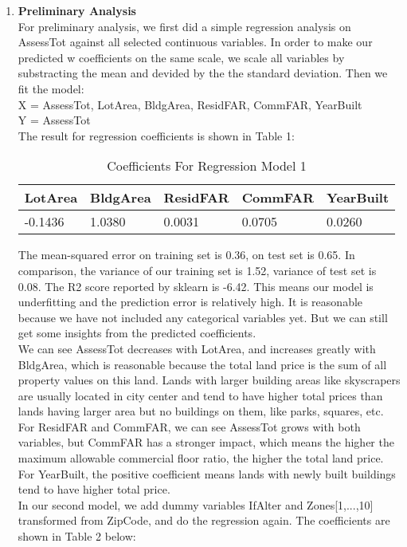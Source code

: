 \documentclass[11pt]{article}
\begin{document}
\begin{enumerate}
\item
\textbf{Preliminary Analysis}\\
For preliminary analysis, we first did a simple regression analysis on AssessTot against all selected continuous variables. In order to make our predicted w coefficients on the same scale, we scale all variables by substracting the mean and devided by the the standard deviation. Then we fit the model:\\
X = AssessTot, LotArea, BldgArea, ResidFAR, CommFAR, YearBuilt\\
Y = AssessTot\\
The result for regression coefficients is shown in Table 1:\\
\begin{table}[H]
\centering
\caption{Coefficients For Regression Model 1}
\label{my-label}
\begin{tabular}{|p{2cm}|p{2cm}|p{2cm}|p{2cm}|p{2cm}|}
\hline
LotArea & BldgArea & ResidFAR & CommFAR & YearBuilt \\
\hline
-0.1436 & 1.0380   & 0.0031   & 0.0705  & 0.0260    \\
\hline
\end{tabular}
\end{table}
The mean-squared error on training set is 0.36, on test set is 0.65. In comparison, the variance of our training set is 1.52, variance of test set is 0.08. The R2 score reported by sklearn is -6.42. This means our model is underfitting and the prediction error is relatively high. It is reasonable because we have not included any categorical variables yet. But we can still get some insights from the predicted coefficients. \\
We can see AssessTot decreases with LotArea, and increases greatly with BldgArea, which is reasonable because the total land price is the sum of all property values on this land. Lands with larger building areas like skyscrapers are usually located in city center and tend to have higher total prices than lands having larger area but no buildings on them, like parks, squares, etc. For ResidFAR and CommFAR, we can see AssessTot grows with both variables, but CommFAR has a stronger impact, which means the higher the maximum allowable commercial floor ratio, the higher the total land price. For YearBuilt, the positive coefficient means lands with newly built buildings tend to have higher total price.\\
In our second model, we add dummy variables IfAlter and Zones[1,...,10] transformed from ZipCode, and do the regression again. The coefficients are shown in Table 2 below:\\

\end{enumerate}
\end{document}
